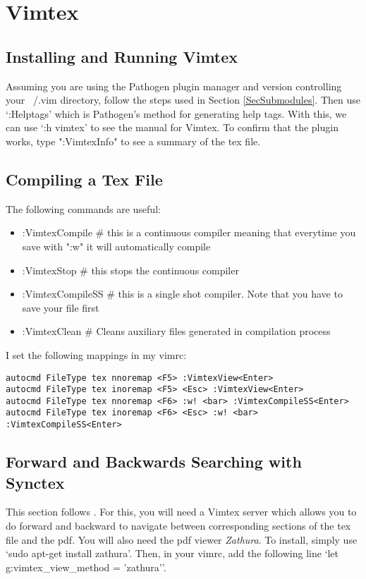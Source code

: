 \documentclass[10pt]{article}
\begin{document}
\section{Vimtex}
\subsection{Installing and Running Vimtex}
Assuming you are using the Pathogen plugin manager and version controlling your ~/.vim directory, follow the steps used
in Section \ref{SecSubmodules}. Then use `:Helptags' which is Pathogen's method for generating help tags. With this, we
can use `:h vimtex' to see the manual for Vimtex. To confirm that the plugin works, type ":VimtexInfo" to see a summary
of the tex file.
\subsection{Compiling a Tex File}
The following commands are useful:
\begin{itemize}
    \item :VimtexCompile \# this is a continuous compiler meaning that everytime you save with ":w" it will
        automatically compile
    \item :VimtexStop \# this stops the continuous compiler
    \item :VimtexCompileSS \# this is a single shot compiler. Note that you have to save your file first
    \item :VimtexClean \# Cleans auxiliary files generated in compilation process 
\end{itemize}
I set the following mappings in my vimrc:
\begin{lstlisting}
autocmd FileType tex nnoremap <F5> :VimtexView<Enter>
autocmd FileType tex inoremap <F5> <Esc> :VimtexView<Enter>
autocmd FileType tex nnoremap <F6> :w! <bar> :VimtexCompileSS<Enter>
autocmd FileType tex inoremap <F6> <Esc> :w! <bar> :VimtexCompileSS<Enter>
\end{lstlisting}

\subsection{Forward and Backwards Searching with Synctex}
This section follows \cite{gunther2014vimtex}. For this, you will need a Vimtex server which allows you to do
forward and backward to navigate between corresponding sections of the tex file and the pdf. You will also need
the pdf viewer \textit{Zathura}. To install, simply use `sudo apt-get install zathura'. Then, in your vimrc, add the
following line `let g:vimtex\_view\_method = 'zathura''.\\
\end{document}
